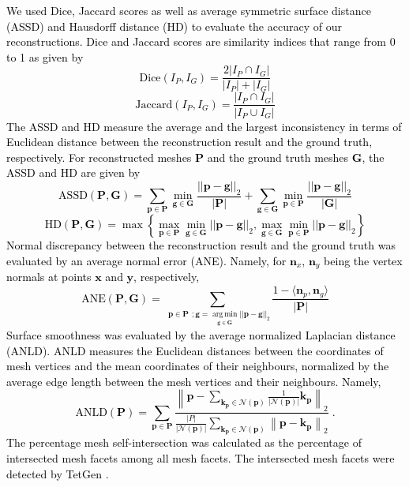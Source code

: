 \documentclass[times,review,preprint,authoryear]{elsarticle}
\DeclareMathOperator*{\argmin}{arg\,min}
\begin{document}
\textcolor{black}{
We used Dice, Jaccard scores as well as average symmetric surface distance (ASSD) and Hausdorff distance (HD) to evaluate the accuracy of our reconstructions. Dice and Jaccard scores are similarity indices that range from 0 to 1 as given by
\begin{equation}
    \text{Dice}(I_P, I_G) = \frac{2 |I_P \cap I_G|}{|I_P|+ |I_G|}
    \label{dice}
\end{equation}
\begin{equation}
    \text{Jaccard}(I_P, I_G) = \frac{|I_P \cap I_G|}{|I_P \cup I_G|}
    \label{jaccard}
\end{equation}
The ASSD and HD measure the average and the largest inconsistency in terms of Euclidean distance between the reconstruction result and the ground truth, respectively. For reconstructed meshes $\mathbf{P}$ and the ground truth meshes $\mathbf{G}$, the ASSD and HD are given by
\begin{equation}
    \text{ASSD}(\mathbf{P}, \mathbf{G}) = \sum_{\mathbf{p} \in \mathbf{P}} \min_{\mathbf{g} \in \mathbf{G}}\frac{  ||\mathbf{p}-\mathbf{g}||_2}{|\mathbf{P}|} + \sum_{\mathbf{g}\in \mathbf{G}} \min_{\mathbf{p}\in \mathbf{P}}\frac{ ||\mathbf{p}-\mathbf{g}||_2 }{|\mathbf{G}|}
\end{equation}
\begin{equation}
    \text{HD}(\mathbf{P}, \mathbf{G}) = \max \left\{\max_{\mathbf{p} \in \mathbf{P}}\min_{\mathbf{g} \in \mathbf{G}} ||\mathbf{p}-\mathbf{g}||_2, \max_{\mathbf{g} \in \mathbf{G}}\min_{\mathbf{p} \in \mathbf{P}} ||\mathbf{p}-\mathbf{g}||_2\right\}
\end{equation}
Normal discrepancy between the reconstruction result and the ground truth was evaluated by an average normal error (ANE). Namely, for $\mathbf{n}_x$, $\mathbf{n}_y$ being the vertex normals at points $\mathbf{x}$ and $\mathbf{y}$, respectively, 
\begin{equation}
    \text{ANE} (\mathbf{P}, \mathbf{G}) = \sum_{\substack{\mathbf{p} \in \mathbf{P}}; \mathbf{g}=\argmin \limits_{\substack{ \mathbf{g} \in \mathbf{G}}}||\mathbf{p}-\mathbf{g}||_2 } \frac{1 - \langle \mathbf{n}_p , \mathbf{n}_g \rangle}{|\mathbf{P}|}
\end{equation}
Surface smoothness was evaluated by the average normalized Laplacian distance (ANLD). ANLD measures the Euclidean distances between the coordinates of mesh vertices and the mean coordinates of their neighbours, normalized by the average edge length between the mesh vertices and their neighbours. Namely, 
\begin{equation}
    \text{ANLD} (\mathbf{P}) = \sum_{\mathbf{p}\in \mathbf{P}} \frac{\left\|\mathbf{p}-\sum_{\mathbf{k_p}\in \mathcal{N}(\mathbf{p})} \frac{1}{|\mathcal{N}(\mathbf{p})|}\mathbf{k_p} \right\|_2}{ \frac{|P|}{|\mathcal{N}(\mathbf{p})|} \sum_{\mathbf{k_p}\in \mathcal{N}(\mathbf{p})}\left\|\mathbf{p} - \mathbf{k_p}\right\|_2}\;.
\end{equation} 
The percentage mesh self-intersection was calculated as the percentage of intersected mesh facets among all mesh facets. The intersected mesh facets were detected by TetGen \cite{Si2015}.
}
\end{document}
